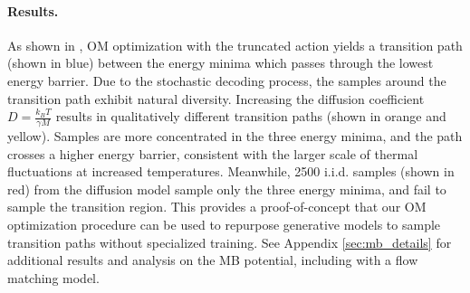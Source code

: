 \paragraph{Results.} As shown in , OM optimization with the truncated action yields a transition path (shown in blue) between the energy minima which passes through the lowest energy barrier. Due to the stochastic decoding process, the samples around the transition path exhibit natural diversity. Increasing the diffusion coefficient $D = \frac{k_BT}{\gamma M}$ results in qualitatively different transition paths (shown in orange and yellow). Samples are more concentrated in the three energy minima, and the path crosses a higher energy barrier, consistent with the larger scale of thermal fluctuations at increased temperatures. Meanwhile, 2500 i.i.d. samples (shown in red) from the diffusion model sample only the three energy minima, and fail to sample the transition region. This provides a proof-of-concept that our OM optimization procedure can be used to repurpose generative models to sample transition paths without specialized training. See Appendix \ref{sec:mb_details} for additional results and analysis on the MB potential, including with a flow matching model.
\vspace{-5pt}
